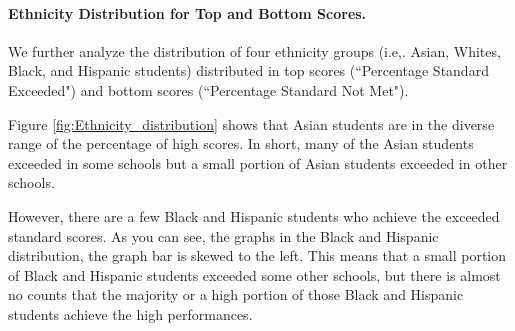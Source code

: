\documentclass[11pt]{article}
\begin{document}
\paragraph{Ethnicity Distribution for Top and Bottom Scores.}
We further analyze the distribution of four ethnicity groups (i.e,. Asian, Whites, Black, and Hispanic students) 
distributed in top scores (``Percentage Standard Exceeded") and bottom scores (``Percentage Standard Not Met").

Figure \ref{fig:Ethnicity_distribution} shows that Asian students are in the diverse range of the percentage of high scores. In short, many of the Asian students exceeded in some schools but a small portion of Asian students exceeded in other schools.

However, there are a few Black and Hispanic students who achieve the exceeded standard scores. As you can see, the graphs in the Black and Hispanic distribution, the graph bar is skewed to the left. This means that a small portion of Black and Hispanic students exceeded some other schools, but there is almost no counts that the majority or a high portion of those Black and Hispanic students achieve the high performances.
\end{document}
